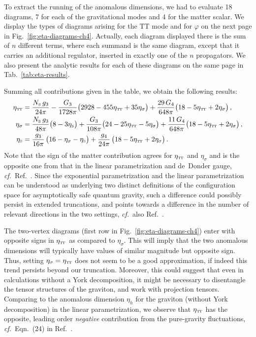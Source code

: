 \documentclass[11pt]{book}
\newcommand\TTspace{ -1pt }
\newcommand\etaTT{ \eta_{\scriptscriptstyle{\mathrm{T\hspace{\TTspace}T}}} }
\newcommand\etaS{ \eta_{\scriptscriptstyle{\mathrm{S}}} }
\newcommand\NS{ N_{\scriptscriptstyle{\mathrm{S}}} }
\newcommand\cf{\textit{cf.}\ }
\numberwithin{equation}{chapter}
\begin{document}
To extract the running of the anomalous dimensions, we had to evaluate 18 diagrams, 7 for
each of the gravitational modes and 4 for the matter scalar. We display the types of
diagrams arising for the $\mathrm{TT}$ mode and for $\varphi$ on the next page in
Fig.~\ref{fig:eta-diagrams-ch4}.
Actually, each diagram displayed there is the sum of $n$ different terms,
where each summand is the same diagram, except that it carries an additional regulator,
inserted in exactly one of the $n$ propagators. We also present the analytic results for
each of these diagrams on the same page in Tab.~\ref{tab:eta-results}.

Summing all contributions given in the table, we obtain the following results:
\begin{align}
  \etaTT      &= \frac{\NS \, g_3}{24 \pi} - \frac{G_3}{1728 \pi} \big( 2928 - 455 \etaTT + 35 \eta_\sigma \big)
  + \frac{29 \, G_4}{648 \pi} \big( 18 - 5 \etaTT + 2 \eta_\sigma \big) \,,
  \label{etaTTcomplete} \\
  \eta_\sigma &= \frac{\NS \, g_3}{48 \pi} \big( 8-3 \etaS \big) + \frac{G_3}{108 \pi} \big( 24 - 25\etaTT - 5 \eta_\sigma \big)
   +\frac{11 \, G_4}{648 \pi} \big( 18 - 5 \etaTT + 2 \eta_\sigma \big) \,,
  \label{etasigmacomplete} \\
  \etaS &= \frac{g_3}{16\pi} \, \big(16-\eta_{\sigma}-\etaS \big)
  + \frac{g_4}{24 \pi} \, \big( 18 - 5 \etaTT + 2 \eta_{\sigma} \big) \,.
\end{align}
Note that the sign of the matter contribution agrees for $\etaTT$ and $\eta_\sigma$
and is the opposite one from that in the linear parametrization and de~Donder gauge,
\cf Ref.~\cite{Dona:2013qba}. Since the exponential parametrization and the linear parametrization
can be understood as underlying two distinct definitions of the configuration space for
asymptotically safe quantum gravity, such a difference could possibly persist in extended truncations,
and points towards a difference in the number of relevant directions in the two settings,
\cf also Ref.~\cite{Ohta:2015efa}.

The two-vertex diagrams (first row in Fig.~\ref{fig:eta-diagrams-ch4})
enter with opposite signs in $\etaTT$ as compared to $\eta_\sigma$.
This will imply that the two anomalous dimensions will typically have values of similar magnitude
but opposite sign. Thus, setting $\eta_\sigma = \etaTT$ does not seem to be a good approximation,
if indeed this trend persists beyond our truncation.
Moreover, this could suggest that even in calculations without a York decomposition,
it might be necessary to disentangle the tensor structures of the graviton,
and work with projection tensors.
Comparing to the anomalous dimension $\eta_h$ for the graviton (without York decomposition)
in the linear parametrization, we observe that $\etaTT$ has the opposite,
leading order \emph{negative} contribution from the pure-gravity fluctuations,
\cf Eqn.~(24) in Ref.~\cite{Dona:2013qba}.
\end{document}
